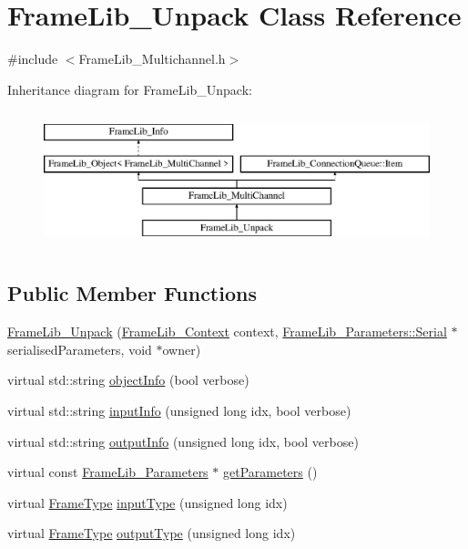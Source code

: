 \hypertarget{class_frame_lib___unpack}{}\section{Frame\+Lib\+\_\+\+Unpack Class Reference}
\label{class_frame_lib___unpack}


{\ttfamily \#include $<$Frame\+Lib\+\_\+\+Multichannel.\+h$>$}

Inheritance diagram for Frame\+Lib\+\_\+\+Unpack\+:\begin{figure}[H]
\begin{center}
\leavevmode
\includegraphics[height=4.000000cm]{class_frame_lib___unpack}
\end{center}
\end{figure}
\subsection*{Public Member Functions}
\begin{DoxyCompactItemize}
\item 
\hyperlink{class_frame_lib___unpack_a987b9186fb9ec69664610f3893063dcc}{Frame\+Lib\+\_\+\+Unpack} (\hyperlink{class_frame_lib___context}{Frame\+Lib\+\_\+\+Context} context, \hyperlink{class_frame_lib___parameters_1_1_serial}{Frame\+Lib\+\_\+\+Parameters\+::\+Serial} $\ast$serialised\+Parameters, void $\ast$owner)
\item 
virtual std\+::string \hyperlink{class_frame_lib___unpack_ab298a6feb7c051f3563a01caacd99c02}{object\+Info} (bool verbose)
\item 
virtual std\+::string \hyperlink{class_frame_lib___unpack_a1ee09b9d9ab16f598f3462d9b29533be}{input\+Info} (unsigned long idx, bool verbose)
\item 
virtual std\+::string \hyperlink{class_frame_lib___unpack_a7e9a710850c3d94d73d00ea27a90d494}{output\+Info} (unsigned long idx, bool verbose)
\item 
virtual const \hyperlink{class_frame_lib___parameters}{Frame\+Lib\+\_\+\+Parameters} $\ast$ \hyperlink{class_frame_lib___unpack_aa9da91c13a8e4d648bdef0037973dc56}{get\+Parameters} ()
\item 
virtual \hyperlink{_frame_lib___types_8h_ad495a9f61af7fff07d7e97979d1ab854}{Frame\+Type} \hyperlink{class_frame_lib___unpack_a003ea8257f11fe375cc9bf2e6b5a8db1}{input\+Type} (unsigned long idx)
\item 
virtual \hyperlink{_frame_lib___types_8h_ad495a9f61af7fff07d7e97979d1ab854}{Frame\+Type} \hyperlink{class_frame_lib___unpack_a7a88aeaeeaa657858c014a685ef901e7}{output\+Type} (unsigned long idx)
\end{DoxyCompactItemize}
